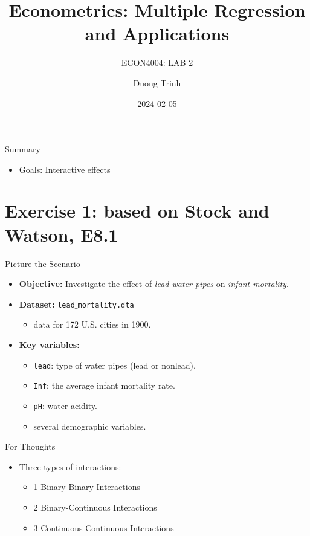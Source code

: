 \documentclass[
  10pt,
  ignorenonframetext,
]{beamer}
\title{Econometrics: Multiple Regression and Applications}
\subtitle{ECON4004: LAB 2}
\author{Duong Trinh}
\date{2024-02-05}
\institute{University of Glasgow}
\providecommand{\tightlist}{%
  \setlength{\itemsep}{0pt}\setlength{\parskip}{0pt}}
\begin{document}
\frame{\titlepage}

\begin{frame}{Summary}
\protect\hypertarget{summary}{}
\begin{itemize}
\tightlist
\item
  Goals: Interactive effects
\end{itemize}
\end{frame}

\hypertarget{exercise-1-based-on-stock-and-watson-e8.1}{%
\section{Exercise 1: based on Stock and Watson,
E8.1}\label{exercise-1-based-on-stock-and-watson-e8.1}}

\begin{frame}[fragile]{Picture the Scenario}
\protect\hypertarget{picture-the-scenario}{}
\begin{itemize}
\item
  \textbf{Objective:} Investigate the effect of \emph{lead water pipes}
  on \emph{infant mortality}.
\item
  \textbf{Dataset:} \texttt{lead$\_$mortality.dta}

  \begin{itemize}
  \tightlist
  \item
    data for 172 U.S. cities in 1900.
  \end{itemize}
\item
  \textbf{Key variables:}

  \begin{itemize}
  \tightlist
  \item
    \texttt{lead}: type of water pipes (lead or nonlead).
  \item
    \texttt{Inf}: the average infant mortality rate.
  \item
    \texttt{pH}: water acidity.
  \item
    several demographic variables.
  \end{itemize}
\end{itemize}
\end{frame}

\begin{frame}{For Thoughts}
\protect\hypertarget{for-thoughts}{}
\begin{itemize}
\tightlist
\item
  Three types of interactions:

  \begin{itemize}
  \tightlist
  \item
    1 Binary-Binary Interactions
  \item
    2 Binary-Continuous Interactions
  \item
    3 Continuous-Continuous Interactions
  \end{itemize}
\end{itemize}
\end{frame}
\end{document}
